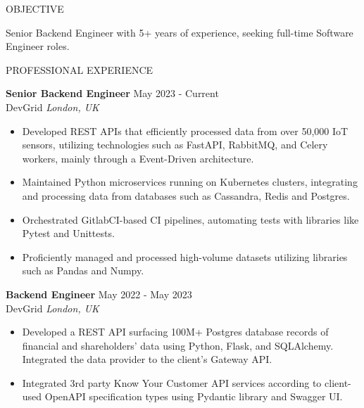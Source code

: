 \documentclass{resume} %
\begin{document}

\begin{rSection}{OBJECTIVE}

{Senior Backend Engineer with 5+ years of experience, seeking full-time Software Engineer roles.}


\end{rSection}

\begin{rSection}{PROFESSIONAL EXPERIENCE}

\textbf{Senior Backend Engineer} \hfill May 2023 - Current\\
DevGrid \hfill \textit{London, UK}
 \begin{itemize}
    \itemsep -3pt {} 
     \item Developed REST APIs that efficiently processed data from over 50,000 IoT sensors, utilizing technologies such as FastAPI, RabbitMQ, and Celery workers, mainly through a Event-Driven architecture.
     \item Maintained Python microservices running on Kubernetes clusters, integrating and processing data from databases such as Cassandra, Redis and Postgres.
     \item Orchestrated GitlabCI-based CI pipelines, automating tests with libraries like Pytest and Unittests.
     \item Proficiently managed and processed high-volume datasets utilizing libraries such as Pandas and Numpy.
 \end{itemize}
 
\textbf{Backend Engineer} \hfill May 2022 - May 2023\\
DevGrid \hfill \textit{London, UK}
 \begin{itemize}
    \itemsep -3pt {} 
     \item Developed a REST API surfacing 100M+ Postgres database records of financial and shareholders' data using Python, Flask, and SQLAlchemy. Integrated the data provider to the client's Gateway API.
     \item Integrated 3rd party Know Your Customer API services according to client-used OpenAPI specification types using Pydantic library and Swagger UI.
 \end{itemize}


\end{rSection}
\end{document}
